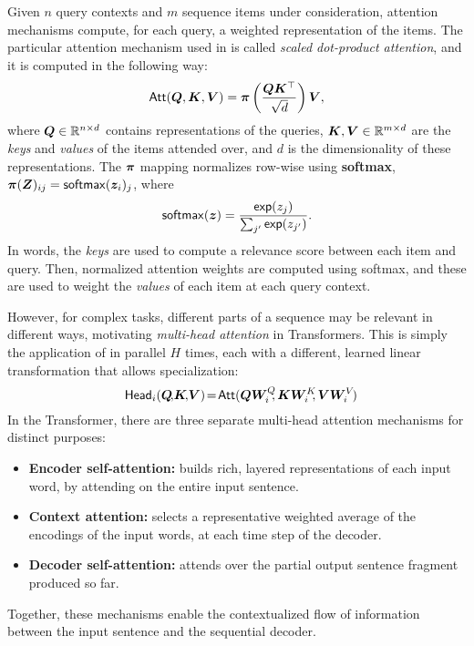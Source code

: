 Given $n$ query contexts and $m$ sequence items under consideration,
attention mechanisms compute, for each query, a weighted
representation of the items. The particular attention mechanism used
in \citet{vaswani2017attention} is called \emph{scaled dot-product
attention}, and it is computed in the following way:
%
\begin{equation}
    \operatorname{\mathsf{Att}}(\bm{Q}, \bm{K}, \bm{V}) = \bm{\pi}
\left(\frac{\bm{Q}\bm{K}^\top}{\sqrt{d}}\right) \bm{V},
    \label{eq:att_scaled_dot}
\end{equation}
%
where $\bm{Q} \in \mathbb{R}^{n \times d}$ contains representations of the
queries, $\bm{K}, \bm{V} \in \mathbb{R}^{m \times d}$
are the \emph{keys} and \emph{values} of the items attended over,
and $d$ is the dimensionality of these
representations.
The $\bm{\pi}$ mapping normalizes row-wise using \textbf{softmax},
$\bm{\pi}(\bm{Z})_{ij} = \operatorname*{\mathsf{softmax}}(\bm{z}_i)_j$, where
%
\begin{equation}\label{eq:softmax}
    \operatorname*{\mathsf{softmax}}(\bm{z}) = \frac{\operatorname*{\mathsf{exp}}(z_j)}{\sum_{j'} \operatorname*{\mathsf{exp}}(z_{j'})}.
\end{equation}
%
In words, the \emph{keys} are used to compute a relevance score
between each item and query. Then, normalized attention weights are computed
using softmax, and these are used to weight the \emph{values} of each item at each
query context.

However, for complex tasks, different parts of a sequence may be relevant in
different ways, motivating \emph{multi-head attention} in Transformers.
This is simply the application of
 in parallel $H$ times, each with a different,
learned linear transformation that allows specialization:
%
\begin{equation}\label{eq:head}%
\hspace{-.01ex}%
\ath_i(\bm{Q}\!,\!\bm{K}\!,\!\bm{V})\!=\!\att(\bm{QW}_i^Q\!\!,\bm{KW}_i^K\!\!,\bm{VW}_i^V\!)%
\hspace{-1.5ex}%
\end{equation}
%
In the Transformer, there are three separate multi-head attention mechanisms for
distinct purposes:
\begin{itemize}
\item \textbf{Encoder self-attention:} builds rich, layered representations of
each input word, by attending on the entire input sentence.
\item \textbf{Context attention:} selects
a representative weighted average of the encodings of the input words, at each
time step of the decoder.
\item \textbf{Decoder self-attention:} attends over the partial output sentence
fragment produced so far.
\end{itemize}
Together, these mechanisms enable the contextualized flow of information between
the input sentence and the sequential decoder.

